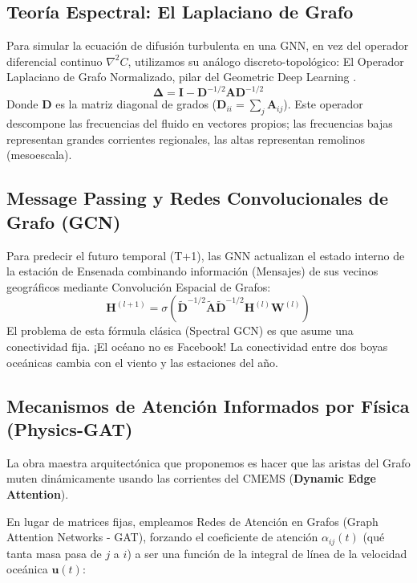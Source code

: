 \documentclass[11pt,a4paper]{article}
\begin{document}
\subsection{Teoría Espectral: El Laplaciano de Grafo}
Para simular la ecuación de difusión turbulenta en una GNN, en vez del operador diferencial continuo $\nabla^2 C$, utilizamos su análogo discreto-topológico: El Operador Laplaciano de Grafo Normalizado, pilar del Geometric Deep Learning \cite{bronstein2021}.
\begin{equation}
\mathbf{\Delta} = \mathbf{I} - \mathbf{D}^{-1/2} \mathbf{A} \mathbf{D}^{-1/2}
\end{equation}
Donde $\mathbf{D}$ es la matriz diagonal de grados ($\mathbf{D}_{ii} = \sum_j \mathbf{A}_{ij}$). Este operador descompone las frecuencias del fluido en vectores propios; las frecuencias bajas representan grandes corrientes regionales, las altas representan remolinos (mesoescala).

\subsection{Message Passing y Redes Convolucionales de Grafo (GCN)}
Para predecir el futuro temporal (T+1), las GNN actualizan el estado interno de la estación de Ensenada combinando información (Mensajes) de sus vecinos geográficos mediante Convolución Espacial de Grafos:
\begin{equation}
\mathbf{H}^{(l+1)} = \sigma \left( \tilde{\mathbf{D}}^{-1/2} \tilde{\mathbf{A}} \tilde{\mathbf{D}}^{-1/2} \mathbf{H}^{(l)} \mathbf{W}^{(l)} \right)
\end{equation}
El problema de esta fórmula clásica (Spectral GCN) es que asume una conectividad fija. ¡El océano no es Facebook! La conectividad entre dos boyas oceánicas cambia con el viento y las estaciones del año.

\subsection{Mecanismos de Atención Informados por Física (Physics-GAT)}
La obra maestra arquitectónica que proponemos es hacer que las aristas del Grafo muten dinámicamente usando las corrientes del CMEMS (\textbf{Dynamic Edge Attention}).

En lugar de matrices fijas, empleamos Redes de Atención en Grafos (Graph Attention Networks - GAT), forzando el coeficiente de atención $\alpha_{ij}(t)$ (qué tanta masa pasa de $j$ a $i$) a ser una función de la integral de línea de la velocidad oceánica $\mathbf{u}(t)$:
\end{document}
